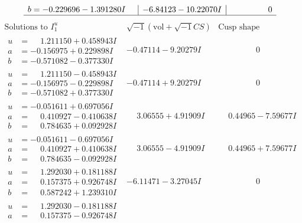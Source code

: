 \documentclass[1p]{elsarticle_modified}
\theoremstyle{definition}
\newcommand{\I}{\sqrt{-1}}
\begin{document}
$$\begin{array}{c|c|c}
\begin{aligned}
b &= -0.229696 - 1.391280 I\end{aligned}
 & -6.84123 - 10.22070 I & \phantom{-0.000000 } 0\\
 \hline 
 \end{array}$$\newpage$$\begin{array}{c|c|c}  
\text{Solutions to }I^u_{1}& \I (\text{vol} + \sqrt{-1}CS) & \text{Cusp shape}\\
 \hline 
\begin{aligned}
u &= \phantom{-}1.211150 + 0.458943 I \\
a &= -0.156975 + 0.229898 I \\
b &= -0.571082 - 0.377330 I\end{aligned}
 & -0.47114 - 9.20279 I & \phantom{-0.000000 } 0 \\ \hline\begin{aligned}
u &= \phantom{-}1.211150 - 0.458943 I \\
a &= -0.156975 - 0.229898 I \\
b &= -0.571082 + 0.377330 I\end{aligned}
 & -0.47114 + 9.20279 I & \phantom{-0.000000 } 0 \\ \hline\begin{aligned}
u &= -0.051611 + 0.697056 I \\
a &= \phantom{-}0.410927 - 0.410638 I \\
b &= \phantom{-}0.784635 + 0.092928 I\end{aligned}
 & \phantom{-}3.06555 + 4.91909 I & \phantom{-}0.44965 - 7.59677 I \\ \hline\begin{aligned}
u &= -0.051611 - 0.697056 I \\
a &= \phantom{-}0.410927 + 0.410638 I \\
b &= \phantom{-}0.784635 - 0.092928 I\end{aligned}
 & \phantom{-}3.06555 - 4.91909 I & \phantom{-}0.44965 + 7.59677 I \\ \hline\begin{aligned}
u &= \phantom{-}1.292030 + 0.181188 I \\
a &= \phantom{-}0.157375 + 0.926748 I \\
b &= \phantom{-}0.587242 + 1.239310 I\end{aligned}
 & -6.11471 - 3.27045 I & \phantom{-0.000000 } 0 \\ \hline\begin{aligned}
u &= \phantom{-}1.292030 - 0.181188 I \\
a &= \phantom{-}0.157375 - 0.926748 I \\

\end{aligned}
\end{array}$$
\end{document}
